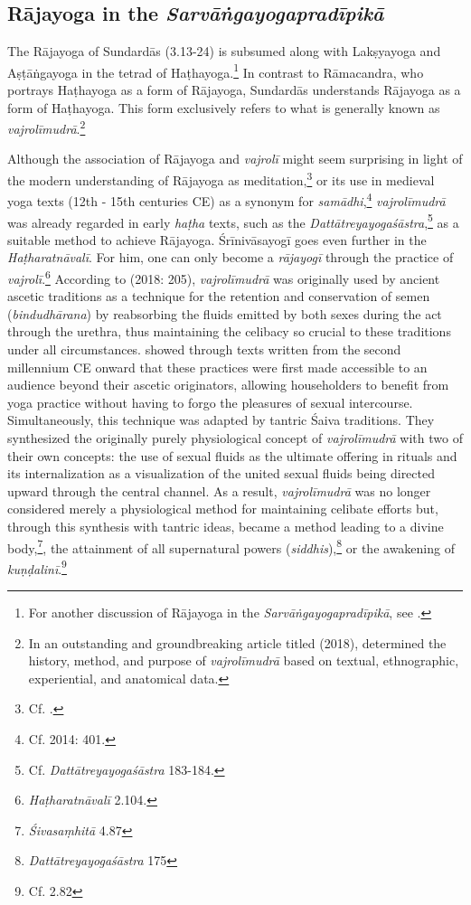 \subsection{Rājayoga in the \emph{Sarvāṅgayogapradīpikā}}

The Rājayoga of Sundardās (3.13-24) is subsumed along with Lakṣyayoga and Aṣṭāṅgayoga in the tetrad of Haṭhayoga.\footnote{For another discussion of Rājayoga in the \emph{Sarvāṅgayogapradīpikā}, see \citeauthor[2014: 696-697]{burger2014sarvangayogapradipika}.} In contrast to Rāmacandra, who portrays Haṭhayoga as a form of Rājayoga, Sundardās understands Rājayoga as a form of Haṭhayoga. This form exclusively refers to what is generally known as \textit{vajrolīmudrā}.\footnote{In an outstanding and groundbreaking article titled  (2018), \citeauthor{mallinson2018vajrolimudra} determined the history, method, and purpose of \textit{vajrolīmudrā} based on textual, ethnographic, experiential, and anatomical data.}

Although the association of Rājayoga and \textit{vajrolī} might seem surprising in light of the modern understanding of Rājayoga as meditation,\footnote{Cf. \citeauthor[2004: 178-180]{demichelishistory2004}.} or its use in medieval yoga texts (12th - 15th centuries CE) as a synonym for \textit{samādhi},\footnote{Cf. \citeauthor{birch2014} 2014: 401.} \textit{vajrolīmudrā} was already regarded in early \textit{haṭha} texts, such as the \emph{Dattātreyayogaśāstra},\footnote{Cf. \emph{Dattātreyayogaśāstra} 183-184.} as a suitable method to achieve Rājayoga. Śrīnivāsayogī goes even further in the \emph{Haṭharatnāvalī}. For him, one can only become a \textit{rājayogī} through the practice of \textit{vajrolī}.\footnote{\emph{Haṭharatnāvalī} 2.104.} According to \citeauthor{mallinson2018vajrolimudra} (2018: 205), \textit{vajrolīmudrā} was originally used by ancient ascetic traditions as a technique for the retention and conservation of semen (\textit{bindudhārana}) by reabsorbing the fluids emitted by both sexes during the act through the urethra, thus maintaining the celibacy so crucial to these traditions under all circumstances. \citeauthor{mallinson2018vajrolimudra} showed through texts written from the second millennium CE onward that these practices were first made accessible to an audience beyond their ascetic originators, allowing householders to benefit from yoga practice without having to forgo the pleasures of sexual intercourse. Simultaneously, this technique was adapted by tantric Śaiva traditions. They synthesized the originally purely physiological concept of \textit{vajrolīmudrā} with two of their own concepts: the use of sexual fluids as the ultimate offering in rituals and its internalization as a visualization of the united sexual fluids being directed upward through the central channel. As a result, \textit{vajrolīmudrā} was no longer considered merely a physiological method for maintaining celibate efforts but, through this synthesis with tantric ideas, became a method leading to a divine body,\footnote{\emph{Śivasaṃhitā} 4.87}, the attainment of all supernatural powers (\textit{siddhis}),\footnote{\emph{Dattātreyayogaśāstra} 175} or the awakening of \textit{kuṇḍalinī}.\footnote{Cf.  2.82}

